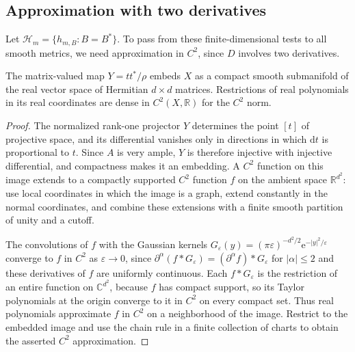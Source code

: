 \subsection{Approximation with two derivatives}

Let $\mathcal H_m=\{h_{m,B}:B=B^*\}$. To pass from these finite-dimensional tests to all smooth metrics, we need approximation in $C^2$, since $D$ involves two derivatives.

\begin{lemma}\label{lem:projector-polynomial-c2-density}
The matrix-valued map $Y=tt^*/\rho$ embeds $X$ as a compact smooth submanifold of the real vector space of Hermitian $d\times d$ matrices. Restrictions of real polynomials in its real coordinates are dense in $C^2(X,\mathbb R)$ for the $C^2$ norm.
\end{lemma}
\begin{proof}
The normalized rank-one projector $Y$ determines the point $[t]$ of projective space, and its differential vanishes only in directions in which $\mathrm dt$ is proportional to $t$. Since $A$ is very ample, $Y$ is therefore injective with injective differential, and compactness makes it an embedding. A $C^2$ function on this image extends to a compactly supported $C^2$ function $f$ on the ambient space $\mathbb R^{d^2}$: use local coordinates in which the image is a graph, extend constantly in the normal coordinates, and combine these extensions with a finite smooth partition of unity and a cutoff.

The convolutions of $f$ with the Gaussian kernels $G_\varepsilon(y)=(\pi\varepsilon)^{-d^2/2}\mathrm e^{-|y|^2/\varepsilon}$ converge to $f$ in $C^2$ as $\varepsilon\to0$, since $\partial^\alpha(f*G_\varepsilon)=(\partial^\alpha f)*G_\varepsilon$ for $|\alpha|\leq2$ and these derivatives of $f$ are uniformly continuous. Each $f*G_\varepsilon$ is the restriction of an entire function on $\mathbb C^{d^2}$, because $f$ has compact support, so its Taylor polynomials at the origin converge to it in $C^2$ on every compact set. Thus real polynomials approximate $f$ in $C^2$ on a neighborhood of the image. Restrict to the embedded image and use the chain rule in a finite collection of charts to obtain the asserted $C^2$ approximation.
\end{proof}

